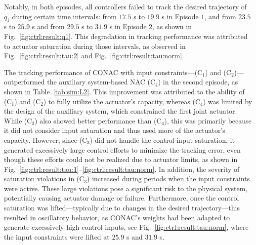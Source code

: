\documentclass[letterpaper, journal]{IEEEtran}
\begin{document}
Notably, in both episodes, all controllers failed to track the desired trajectory of $q_1$ during certain time intervals: from $17.5$ s to $19.9$ s in Episode $1$, and from $23.5$ s to $25.9$ s and from $29.5$ s to $31.9$ s in Episode $2$, as shown in Fig.~\ref{fig:ctrl:result:q1}.
This degradation in tracking performance was attributed to actuator saturation during those intervals, as observed in Fig.~\ref{fig:ctrl:result:tau:2} and Fig.~\ref{fig:ctrl:result:tau:norm}.

The tracking performance of CONAC with input constraints—\ie (C$_1$) and (C$_2$)—outperformed the auxiliary system-based NAC (C$_4$) in the second episode, as shown in Table~\ref{tab:sim:L2}.
This improvement was attributed to the ability of (C$_1$) and (C$_2$) to fully utilize the actuator's capacity, whereas (C$_4$) was limited by the design of the auxiliary system, which constrained the first joint actuator.
While (C$_3$) also showed better performance than (C$_4$), this was primarily because it did not consider input saturation and thus used more of the actuator's capacity.
However, since (C$_3$) did not handle the control input saturation, it generated excessively large control efforts to minimize the tracking error, even though these efforts could not be realized due to actuator limits, as shown in Fig.~\ref{fig:ctrl:result:tau:1}–\ref{fig:ctrl:result:tau:norm}.
In addition, the severity of saturation violations in (C$_3$) increased during periods when the input constraints were active. 
These large violations pose a significant risk to the physical system, potentially causing actuator damage or failure. 
Furthermore, once the control saturation was lifted—typically due to changes in the desired trajectory—this resulted in oscillatory behavior, as CONAC's weights had been adapted to generate excessively high control inputs, see Fig.~\ref{fig:ctrl:result:tau:norm}, where the input constraints were lifted at $25.9$ s and $31.9$ s.
\end{document}
